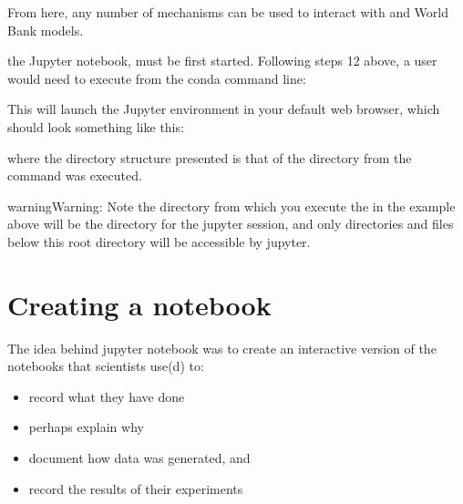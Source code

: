 \documentclass[letterpaper,10pt,english]{jupyterBook}
\begin{document}
\sphinxAtStartPar
{}

\sphinxAtStartPar
From here, any number of mechanisms can be used to interact with  and World Bank models.

\sphinxAtStartPar
{} the Jupyter notebook, must be first started.  Following steps 1\sphinxhyphen{}2 above, a user would need to execute from the conda command line:

\sphinxAtStartPar
{}

\sphinxAtStartPar
This will launch the Jupyter environment in your default web browser, which should look something like this:

\sphinxAtStartPar
{}

\sphinxAtStartPar
where the directory structure presented is that of the directory from the  command was executed.

\begin{sphinxadmonition}{warning}{Warning:}
\sphinxAtStartPar
Note the directory from which you execute the   in the example above will be the  directory for the jupyter session, and only directories and files below this root directory will be accessible by jupyter.
\end{sphinxadmonition}


\section{Creating a notebook}
\label{\detokenize{content/04_PythonEssentials/Intro_Jupyter_notebook:creating-a-notebook}}
\sphinxAtStartPar
The idea behind jupyter notebook was to create an interactive version of the notebooks that scientists use(d) to:
\begin{itemize}
\item {} 
\sphinxAtStartPar
record what they have done

\item {} 
\sphinxAtStartPar
perhaps explain why

\item {} 
\sphinxAtStartPar
document how data was generated, and

\item {} 
\sphinxAtStartPar
record the results of their experiments

\end{itemize}
\end{document}
